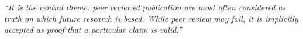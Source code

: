 \documentclass[12pt]{beamer}
\newcommand\ans[1]{{\it ``#1''}}
\begin{document}
\begin{frame}
  
\ans{It is the central theme:  peer reviewed publication are most often considered as truth on which future research is based.  While peer review may fail, it is implicitly accepted as proof that a particular claim is valid.}














\end{frame}
\end{document}
